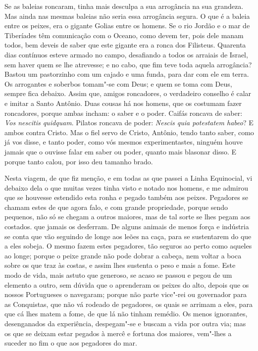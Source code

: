 Se as baleias roncaram, tinha mais desculpa a sua arrogância na sua
grandeza. Mas ainda nas mesmas baleias não seria essa arrogância segura.
O que é a baleia entre os peixes, era o gigante Golias entre os homens.
Se o rio Jordão e o mar de Tiberíades têm comunicação com o Oceano, como
devem ter, pois dele manam todos, bem deveis de saber que este gigante
era a ronca dos Filisteus. Quarenta dias contínuos esteve armado no
campo, desafiando a todos os arraiais de Israel, sem haver quem se lhe
atrevesse; e no cabo, que fim teve toda aquela arrogância? Bastou um
pastorzinho com um cajado e uma funda, para dar com ele em terra. Os
arrogantes e soberbos tomam"-se com Deus; e quem se toma com Deus, sempre
fica debaixo. Assim que, amigos roncadores, o verdadeiro conselho é
calar e imitar a Santo Antônio. Duas cousas há nos homens, que os
costumam fazer roncadores, porque ambas incham: o saber e o poder.
Caifás roncava de saber: \emph{Vos nescitis quidquam}. Pilatos roncava
de poder: \emph{Nescis quia potestatem habeo}? E ambos contra Cristo.
Mas o fiel servo de Cristo, Antônio, tendo tanto saber, como já vos
disse, e tanto poder, como vós mesmos experimentastes, ninguém houve
jamais que o ouvisse falar em saber ou poder, quanto mais blasonar
disso. E porque tanto calou, por isso deu tamanho brado.

Nesta viagem, de que fiz menção, e em todas as que passei a Linha
Equinocial, vi debaixo dela o que muitas vezes tinha visto e notado nos
homens, e me admirou que se houvesse estendido esta ronha e pegado
também aos peixes. Pegadores se chamam estes de que agora falo, e com
grande propriedade, porque sendo pequenos, não só se chegam a outros
maiores, mas de tal sorte se lhes pegam aos costados. que jamais os
desferram. De alguns animais de menos força e
indústria se conta que vão seguindo de longe aos leões na caça, para se
sustentarem do que a eles sobeja. O mesmo fazem estes pegadores, tão
seguros ao perto como aqueles ao longe; porque o peixe grande não pode
dobrar a cabeça, nem voltar a boca sobre os que traz às costas, e assim
lhes sustenta o peso e mais a fome.
Este modo de vida, mais astuto que generoso, se acaso se passou e pegou
de um elemento a outro, sem dúvida que o aprenderam os peixes do alto,
depois que os nossos Portugueses o navegaram; porque não parte vice"-rei
ou governador para as Conquistas, que não vá rodeado de pegadores, os
quais se arrimam a eles, para que cá lhes matem a fome, de que lá não
tinham remédio. Os menos ignorantes, desenganados da experiência,
despegam"-se e buscam a vida por outra via; mas os que se deixam estar
pegados à mercê e fortuna dos maiores, vem"-lhes a suceder no fim o que
aos pegadores do mar.


